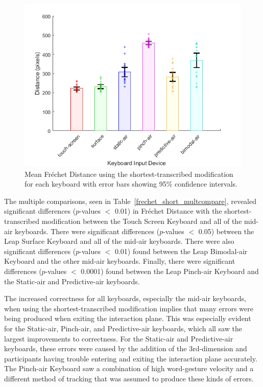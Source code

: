 \begin{figure}[!t]
	\centering
	\includegraphics{Figures/fig_frechet_short_mean}
	\caption[Mean Fr\'echet Distance for Modified-shortest]{Mean Fr\'echet Distance using the shortest-transcribed modification for each keyboard with error bars showing 95\% confidence intervals.}
	\label{fig_frechet_short_mean}
\end{figure}

The multiple comparisons, seen in Table~\ref{frechet_short_multcompare}, revealed significant differences ($p$-values $<$ 0.01) in Fr\'echet Distance with the shortest-transcribed modification between the Touch Screen Keyboard and all of the mid-air keyboards. There were significant differences ($p$-values $<$ 0.05) between the Leap Surface Keyboard and all of the mid-air keyboards. There were also significant differences ($p$-values $<$ 0.01) found between the Leap Bimodal-air Keyboard and the other mid-air keyboards. Finally, there were significant differences ($p$-values $<$ 0.0001) found between the Leap Pinch-air Keyboard and the Static-air and Predictive-air keyboards.

The increased correctness for all keyboards, especially the mid-air keyboards, when using the shortest-transcribed modification implies that many errors were being produced when exiting the interaction plane. This was especially evident for the Static-air, Pinch-air, and Predictive-air keyboards, which all saw the largest improvements to correctness. For the Static-air and Predictive-air keyboards, these errors were caused by the addition of the 3rd-dimension and participants having trouble entering and exiting the interaction plane accurately. The Pinch-air Keyboard saw a combination of high word-gesture velocity and a different method of tracking that was assumed to produce these kinds of errors.

